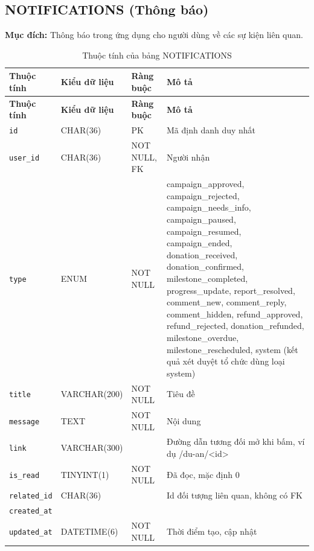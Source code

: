 \subsection{NOTIFICATIONS (Thông báo)}

\textbf{Mục đích:} Thông báo trong ứng dụng cho người dùng về các sự kiện liên quan.

{\small
\begin{longtable}{|P{3.2cm}|P{2.8cm}|P{2.2cm}|p{5.4cm}|}
    \caption{Thuộc tính của bảng NOTIFICATIONS}
    \label{tab:notifications} \\
    \hline
    \textbf{Thuộc tính} & \textbf{Kiểu dữ liệu} & \textbf{Ràng buộc} & \textbf{Mô tả} \\
    \hline
    \endfirsthead
    \hline
    \textbf{Thuộc tính} & \textbf{Kiểu dữ liệu} & \textbf{Ràng buộc} & \textbf{Mô tả} \\
    \hline
    \endhead

    \texttt{id} & CHAR(36) & PK & Mã định danh duy nhất \\
    \hline
    \texttt{user\_\allowbreak{}id} & CHAR(36) & NOT NULL, FK & Người nhận \\
    \hline
    \texttt{type} & ENUM & NOT NULL & campaign\_\allowbreak{}approved, campaign\_\allowbreak{}rejected, campaign\_\allowbreak{}needs\_\allowbreak{}info, campaign\_\allowbreak{}paused, campaign\_\allowbreak{}resumed, campaign\_\allowbreak{}ended, donation\_\allowbreak{}received, donation\_\allowbreak{}confirmed, milestone\_\allowbreak{}completed, progress\_\allowbreak{}update, report\_\allowbreak{}resolved, comment\_\allowbreak{}new, comment\_\allowbreak{}reply, comment\_\allowbreak{}hidden, refund\_\allowbreak{}approved, refund\_\allowbreak{}rejected, donation\_\allowbreak{}refunded, milestone\_\allowbreak{}overdue, milestone\_\allowbreak{}rescheduled, system (kết quả xét duyệt tổ chức dùng loại system) \\
    \hline
    \texttt{title} & VARCHAR(200) & NOT NULL & Tiêu đề \\
    \hline
    \texttt{message} & TEXT & NOT NULL & Nội dung \\
    \hline
    \texttt{link} & VARCHAR(300) &  & Đường dẫn tương đối mở khi bấm, ví dụ /du-an/\textless{}id\textgreater{} \\
    \hline
    \texttt{is\_\allowbreak{}read} & TINYINT(1) & NOT NULL & Đã đọc, mặc định 0 \\
    \hline
    \texttt{related\_\allowbreak{}id} & CHAR(36) &  & Id đối tượng liên quan, không có FK \\
    \hline
    \texttt{created\_\allowbreak{}at} &  &  &  \\
    \hline
    \texttt{updated\_\allowbreak{}at} & DATETIME(6) & NOT NULL & Thời điểm tạo, cập nhật \\
    \hline
\end{longtable}
}

